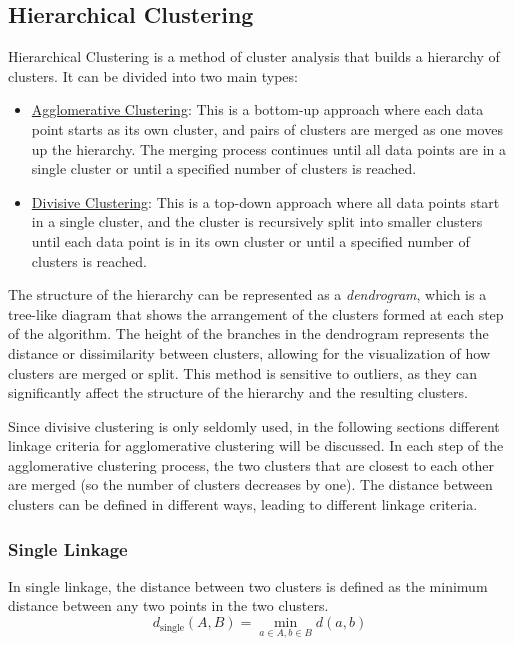 \subsection{Hierarchical Clustering}

Hierarchical Clustering is a method of cluster analysis that builds a hierarchy of clusters. It can be divided into two main types:
\begin{itemize}
    \item \ul{Agglomerative Clustering}: This is a bottom-up approach where each data point starts as its own cluster, and pairs of clusters are merged as one moves up the hierarchy. The merging process continues until all data points are in a single cluster or until a specified number of clusters is reached.
    \item \ul{Divisive Clustering}: This is a top-down approach where all data points start in a single cluster, and the cluster is recursively split into smaller clusters until each data point is in its own cluster or until a specified number of clusters is reached.
\end{itemize}

The structure of the hierarchy can be represented as a \emph{dendrogram}, which is a tree-like diagram that shows the arrangement of the clusters formed at each step of the algorithm. The height of the branches in the dendrogram represents the distance or dissimilarity between clusters, allowing for the visualization of how clusters are merged or split. This method is sensitive to outliers, as they can significantly affect the structure of the hierarchy and the resulting clusters.

Since divisive clustering is only seldomly used, in the following sections different linkage criteria for agglomerative clustering will be discussed. In each step of the agglomerative clustering process, the two clusters that are closest to each other are merged (so the number of clusters decreases by one). The distance between clusters can be defined in different ways, leading to different linkage criteria.

\subsubsection{Single Linkage}
In single linkage, the distance between two clusters is defined as the minimum distance between any two points in the two clusters.
\begin{equation*}
    d_{\text{single}}(A, B) = \min_{a\in A, b\in B} d(a, b)
\end{equation*}


